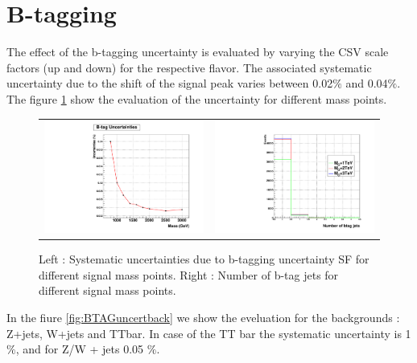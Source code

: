 \section{B-tagging}

The effect of the b-tagging uncertainty is evaluated by varying the CSV scale factors (up and down) for the respective flavor. The associated systematic uncertainty due to the shift of the signal peak varies between 0.02$\%$ and 0.04$\%$. The figure \ref{fig:BTAGuncert} show the evaluation of the uncertainty for different mass points.

\begin{figure}[!ht]
\caption{ Left : Systematic uncertainties due to b-tagging uncertainty SF for different signal mass points. Right : Number of b-tag jets for different signal mass points.}
\begin{tabular}{cc}
 \includegraphics[width=220pt]{figures/SystUncert/UncertBTAG.pdf} &
\includegraphics[width=220pt]{figures/SystUncert/Nbtagjets.pdf}\\
\end{tabular}
\label{fig:BTAGuncert}
\end{figure}

In the fiure \ref{fig:BTAGuncertback} we show the eveluation for the backgrounds : Z+jets, W+jets and TTbar. In case of the TT bar the systematic uncertainty is 1 $\%$, and for Z/W + jets 0.05 $\%$. 

